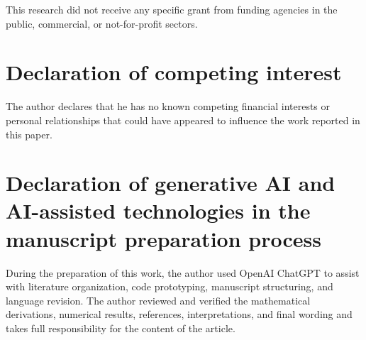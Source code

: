 \documentclass[preprint,12pt]{elsarticle}
\theoremstyle{remark}
\begin{document}
This research did not receive any specific grant from funding agencies
in the public, commercial, or not-for-profit sectors.

\section*{Declaration of competing interest}

The author declares that he has no known competing financial interests
or personal relationships that could have appeared to influence the
work reported in this paper.

\section*{Declaration of generative AI and AI-assisted technologies in
the manuscript preparation process}

During the preparation of this work, the author used OpenAI ChatGPT to
assist with literature organization, code prototyping, manuscript
structuring, and language revision. The author reviewed and verified
the mathematical derivations, numerical results, references,
interpretations, and final wording and takes full responsibility for
the content of the article.
\end{document}
